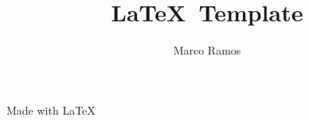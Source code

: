 \documentclass[a4paper]{article}
\title{\LaTeX\ Template}
\author[1]{Marco Ramos}
\affil[1]{Coventry University, Coventry, UK}
\begin{document}
	
	
	\newpage
	\restoregeometry		%
	\maketitle				%
	\thispagestyle{empty}	%
	\vfill					%
	\begin{center}
		Made with \LaTeX
	\end{center}
	
		
	
	
	\newpage
		
	
	
	
	
	\newpage
	\printbibliography
\end{document}
